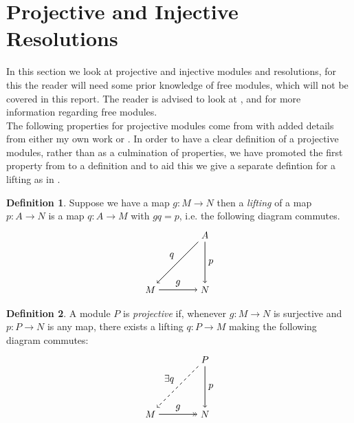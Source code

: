 \documentclass[11.5pt, twoside, a4paper, titlepage]{report}
\theoremstyle{definition}
\newtheorem{mydef}{Definition}[section]
\theoremstyle{plain}
\begin{document}

\section{Projective and Injective Resolutions}

In this section we look at projective and injective modules and resolutions, for this the reader will need some prior knowledge of free modules, which will not be covered in this report. The reader is advised to look at \cite{Stamm}, \cite{Weibel} and \cite{Rotman} for more information regarding free modules.\\
The following properties for projective modules come from \cite{CB1} with added details from either my own work or \cite{Rotman}. In order to have a clear definition of a projective modules, rather than as a culmination of properties, we have promoted the first property from \cite{CB1} to a definition and to aid this we give a separate defintion for a lifting as in \cite{Rotman}.

\begin{mydef}
Suppose we have a map $g:M \to N$ then a \emph{lifting} of a map $p:A \to N$ is a map $q:A\to M$ with $gq=p$, i.e. the following diagram commutes.
\begin{equation*}
\begin{tikzpicture}[->,-latex, auto, main path/.style={->, semithick}, main node/.style={}]
\node	[main node]		(1) at (0,0)		{$M$};
\node	[main node]		(2) at (2,0)		{$N$};
\node [main node]		(3) at (2,2)		{$A$};

\draw (1) edge [main path] node [auto] {$g$} (2);
\draw (3) edge [main path] node [auto] {$p$} (2);
\draw (3) edge [main path] node [auto, swap] {$q$} (1);
\end{tikzpicture}
\end{equation*}
\end{mydef}

\begin{mydef}
A module $P$ is \emph{projective} if, whenever $g:M\to N$ is surjective and $p:P\to N$ is any map, there exists a lifting $q:P \to M$ making the following diagram commutes:
\begin{equation*}
\begin{tikzpicture}[->,-latex, auto, main path/.style={->, semithick}, main node/.style={}]
\node	[main node]		(1) at (0,0)		{$M$};
\node	[main node]		(2) at (2,0)		{$N$};
\node [main node]		(3) at (2,2)		{$P$};

\draw (1) edge [->>, semithick] node [auto] {$g$} (2);
\draw (3) edge [main path] node [auto] {$p$} (2);
\draw (3) edge [dashed, ->, semithick] node [auto, swap] {$\exists q$} (1);
\end{tikzpicture}
\end{equation*}
\end{mydef}
\end{document}
